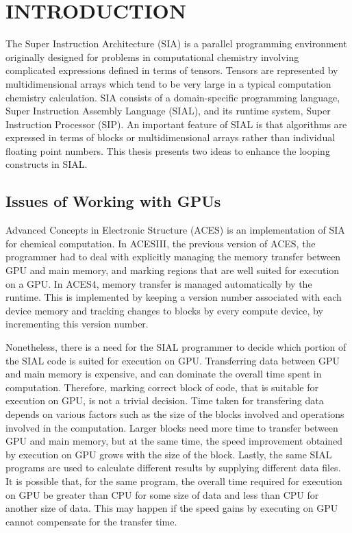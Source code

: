 \chapter{INTRODUCTION}\label{intro}
The Super Instruction Architecture (SIA)\cite{Sanders:2010:BLR:1884643.1884677} is a parallel programming environment
originally designed for problems in computational chemistry involving complicated
expressions defined in terms of tensors. Tensors are represented by
multidimensional arrays which tend to be very large in a typical computation chemistry
calculation. SIA consists of a
domain-specific programming language, Super Instruction Assembly Language
(SIAL), and its runtime system, Super Instruction Processor (SIP). An important
feature of SIAL is that algorithms are expressed in terms of blocks or
multidimensional arrays rather than individual floating point numbers. This thesis
presents two ideas to enhance the looping constructs in SIAL.

\section{Issues of Working with GPUs}
Advanced Concepts in Electronic Structure (ACES)\cite{doi:10.1002/qua.560440876, doi:10.1002/wcms.77} is an implementation of SIA for
chemical computation.
In ACESIII\cite{Jindal2016}, the previous version of ACES, the programmer had to deal with explicitly managing
the memory transfer between GPU and main memory, and marking regions that are well suited for execution
on a GPU. In ACES4, memory transfer is managed automatically by the runtime.
This is implemented by keeping a version number associated with each device memory
and tracking changes to blocks by every compute device, by incrementing this version
number.

Nonetheless, there is a need for the SIAL programmer to decide which portion of the SIAL code
is suited for execution on GPU. Transferring data between GPU and main memory is
expensive\cite{datatransferoptimization}, and can dominate the overall time spent in computation. Therefore, marking
correct block of code, that is suitable for execution on GPU, is not
a trivial decision. Time taken for transfering data depends on various factors such as
the size of the blocks involved and operations involved in the computation.
Larger blocks need more time to transfer between GPU and main memory, but at the
same time, the speed improvement obtained by execution on GPU grows
with the size of the block. Lastly, the same SIAL programs are used to
calculate different results by supplying different data files. It is possible that,
for the same program, the overall time required for execution on GPU be greater
than CPU for some size of data and less than CPU for another size of data.
This may happen if the speed gains by executing on GPU cannot compensate for the
transfer time.

